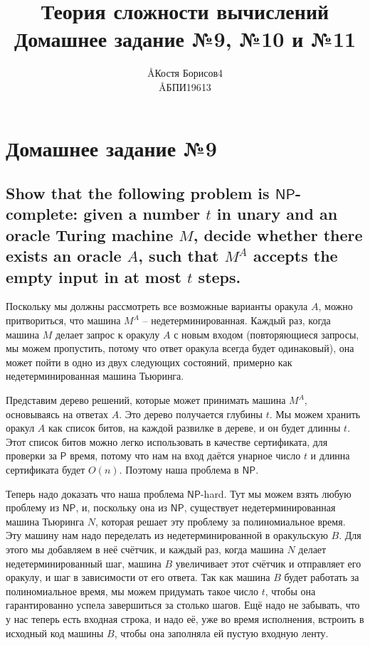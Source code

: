 \documentclass{article}
\title{Теория сложности вычислений \\ Домашнее задание №9, №10 и №11}
\author{\AA{Костя Борисов}{4} \\ \AA{БПИ196}{13}}
\newcommand{\NP}{\ensuremath{\mathsf{NP}}}
\renewcommand{\P}{\ensuremath{\mathsf{P}}}
\begin{document}
  \maketitle

  \setcounter{section}{8}
  \section{Домашнее задание №9}
  \setcounter{subsection}{8}
  \subsection{Show that the following problem is \NP-complete: given a number $t$ in unary and an oracle Turing machine $M$, decide whether there exists an oracle $A$, such that $M^A$ accepts the empty input in at most $t$ steps.}
  Поскольку мы должны рассмотреть все возможные варианты оракула $A$, можно притвориться, что машина $M^A$ -- недетерминированная.
  Каждый раз, когда машина $M$ делает запрос к оракулу $A$ с новым входом (повторяющиеся запросы, мы можем пропустить, потому что ответ оракула всегда будет одинаковый), она может пойти в одно из двух следующих состояний, примерно как недетерминированная машина Тьюринга.

  Представим дерево решений, которые может принимать машина $M^A$, основываясь на ответах $A$.
  Это дерево получается глубины $t$.
  Мы можем хранить оракул $A$ как список битов, на каждой развилке в дереве, и он будет длинны $t$.
  Этот список битов можно легко использовать в качестве сертификата, для проверки за \P{} время, потому что нам на вход даётся унарное число $t$ и длинна сертификата будет $O(n)$.
  Поэтому наша проблема в \NP.

  Теперь надо доказать что наша проблема \NP-hard.
  Тут мы можем взять любую проблему из \NP, и, поскольку она из \NP, существует недетерминированная машина Тьюринга $N$, которая решает эту проблему за полиномиальное время.
  Эту машину нам надо переделать из недетерминированной в оракульскую $B$.
  Для этого мы добавляем в неё счётчик, и каждый раз, когда машина $N$ делает недетерминированный шаг, машина $B$ увеличивает этот счётчик и отправляет его оракулу, и шаг в зависимости от его ответа.
  Так как машина $B$ будет работать за полиномиальное время, мы можем придумать такое число $t$, чтобы она гарантированно успела завершиться за столько шагов.
  Ещё надо не забывать, что у нас теперь есть входная строка, и надо её, уже во время исполнения, встроить в исходный код машины $B$, чтобы она заполняла ей пустую входную ленту.
\end{document}

